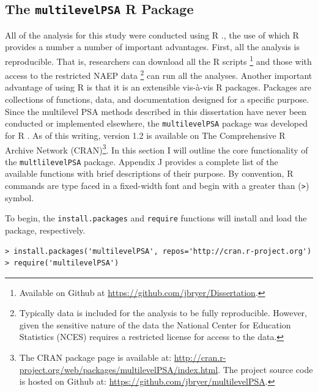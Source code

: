 \documentclass[letterpaper,12p,twoside]{article} %
\begin{document}

\subsection{The \texttt{multilevelPSA} R Package}

All of the analysis for this study were conducted using R \cite{rdevelopment}., the use of which R provides a number a number of important advantages. First, all the analysis is reproducible. That is, researchers can download all the R scripts \footnote{Available on Github at \url{https://github.com/jbryer/Dissertation}.} and those with access to the restricted NAEP data \footnote{Typically data is included for the analysis to be fully reproducible. However, given the sensitive nature of the data the National Center for Education Statistics (NCES) requires a restricted license for access to the data.} can run all the analyses. Another important advantage of using R is that it is an extensible vis-à-vis R packages. Packages are collections of functions, data, and documentation designed for a specific purpose. Since the multilevel PSA methods described in this dissertation have never been conducted or implemented elsewhere, the \texttt{multilevelPSA} package was developed for R \cite{rdevelopment}. As of this writing, version 1.2 is available on The Comprehensive R Archive Network (CRAN)\footnote{The CRAN package page is available at: \url{http://cran.r-project.org/web/packages/multilevelPSA/index.html}. The project source code is hosted on Github at: \url{https://github.com/jbryer/multilevelPSA}.}. In this section I will outline the core functionality of the \texttt{multlilevelPSA} package. Appendix J provides a complete list of the available functions with brief descriptions of their purpose. By convention, R commands are type faced in a fixed-width font and begin with a greater than (\texttt{>}) symbol.

To begin, the \texttt{install.packages} and \texttt{require} functions will install and load the package, respectively.

\begin{verbatim}
> install.packages('multilevelPSA', repos='http://cran.r-project.org')
> require('multilevelPSA')
\end{verbatim}
\end{document}
